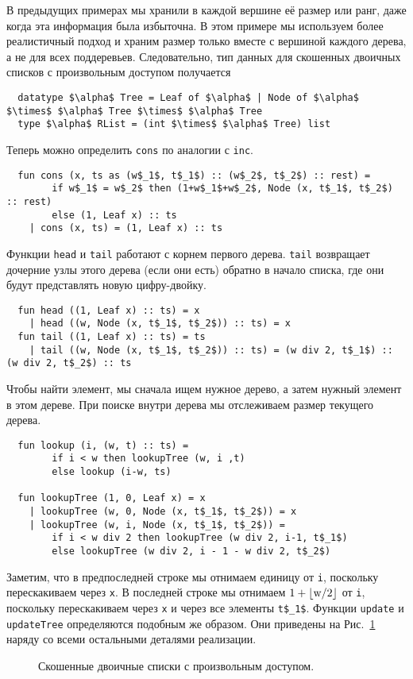 \begin{frame}[fragile]{}
В предыдущих примерах мы хранили в каждой вершине её размер или ранг,
даже когда эта информация была избыточна. В этом примере мы используем
более реалистичный подход и храним размер только вместе с вершиной
каждого дерева, а не для всех поддеревьев. Следовательно, тип данных
для скошенных двоичных списков с произвольным доступом получается
\begin{lstlisting}
  datatype $\alpha$ Tree = Leaf of $\alpha$ | Node of $\alpha$ $\times$ $\alpha$ Tree $\times$ $\alpha$ Tree
  type $\alpha$ RList = (int $\times$ $\alpha$ Tree) list
\end{lstlisting}
Теперь можно определить \lstinline!cons! по аналогии с
\lstinline!inc!.
\begin{lstlisting}
  fun cons (x, ts as (w$_1$, t$_1$) :: (w$_2$, t$_2$) :: rest) =
        if w$_1$ = w$_2$ then (1+w$_1$+w$_2$, Node (x, t$_1$, t$_2$) :: rest)
        else (1, Leaf x) :: ts
    | cons (x, ts) = (1, Leaf x) :: ts
\end{lstlisting}
Функции \lstinline!head! и \lstinline!tail! работают с корнем первого
дерева. \lstinline!tail! возвращает дочерние узлы этого дерева (если
они есть) обратно в начало списка, где они будут представлять новую
цифру-двойку.
\begin{lstlisting}
  fun head ((1, Leaf x) :: ts) = x
    | head ((w, Node (x, t$_1$, t$_2$)) :: ts) = x
  fun tail ((1, Leaf x) :: ts) = ts
    | tail ((w, Node (x, t$_1$, t$_2$)) :: ts) = (w div 2, t$_1$) :: (w div 2, t$_2$) :: ts
\end{lstlisting}
Чтобы найти элемент, мы сначала ищем нужное дерево, а затем нужный
элемент в этом дереве. При поиске внутри дерева мы отслеживаем размер
текущего дерева.
\begin{lstlisting}
  fun lookup (i, (w, t) :: ts) =
        if i < w then lookupTree (w, i ,t)
        else lookup (i-w, ts)

  fun lookupTree (1, 0, Leaf x) = x
    | lookupTree (w, 0, Node (x, t$_1$, t$_2$)) = x
    | lookupTree (w, i, Node (x, t$_1$, t$_2$)) =
        if i < w div 2 then lookupTree (w div 2, i-1, t$_1$)
        else lookupTree (w div 2, i - 1 - w div 2, t$_2$)
\end{lstlisting}
Заметим, что в предпоследней строке мы отнимаем единицу от \lstinline!i!,
поскольку перескакиваем через \lstinline!x!. В последней строке мы
отнимаем $1 + \lfloor \lstinline!w!/2 \rfloor$ от \lstinline!i!,
поскольку перескакиваем через \lstinline!x! и через все элементы
\lstinline!t$_1$!. Функции \lstinline!update! и \lstinline!updateTree!
определяются подобным же образом. Они приведены на Рис.~\ref{fig:9.7}
наряду со всеми остальными деталями реализации.

\begin{figure}
  \centering

  \caption{Скошенные двоичные списки с произвольным доступом.}
  \label{fig:9.7}
\end{figure}

\end{frame}

